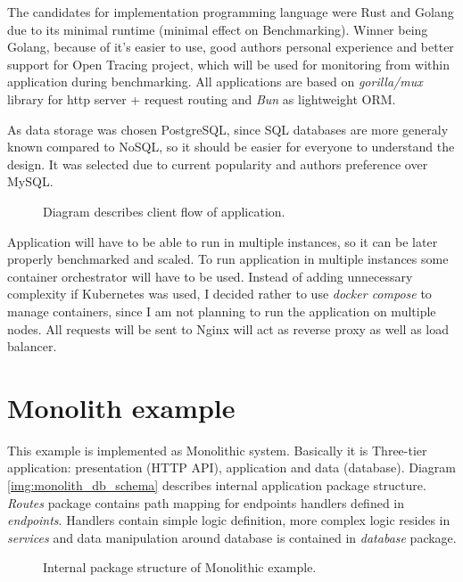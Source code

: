 The candidates for implementation programming language were Rust and Golang due to its minimal runtime (minimal effect on Benchmarking). Winner being Golang, because of it's easier to use, good authors personal experience and better support for Open Tracing project, which will be used for monitoring from within application during benchmarking. All applications are based on \textit{gorilla/mux} \cite{MUX} library for http server + request routing and \textit{Bun} \cite{BUN} as lightweight ORM.

As data storage was chosen PostgreSQL, since SQL databases are more generaly known compared to NoSQL, so it should be easier for everyone to understand the design. It was selected due to current popularity and authors preference over MySQL.
\begin{figure}
    \centering
    
    \caption{Diagram describes client flow of application. \label{img:app_activity_flow}}
\end{figure}

Application will have to be able to run in multiple instances, so it can be later properly benchmarked and scaled. To run application in multiple instances some container orchestrator will have to be used. Instead of adding unnecessary complexity if Kubernetes was used, I decided rather to use \textit{docker compose} to manage containers, since I am not planning to run the application on multiple nodes. All requests will be sent to Nginx will act as reverse proxy as well as load balancer.


\section{Monolith example}
This example is implemented as Monolithic system. Basically it is Three-tier application: presentation (HTTP API), application and data (database). Diagram \ref{img:monolith_db_schema} describes internal application package structure. \textit{Routes} package contains path mapping for endpoints handlers defined in \textit{endpoints}. Handlers contain simple logic definition, more complex logic resides in \textit{services} and data manipulation around database is contained in \textit{database} package.

\begin{figure}
    \centering
    
    \caption{Internal package structure of Monolithic example. \label{img:monolith_package}}
\end{figure}


